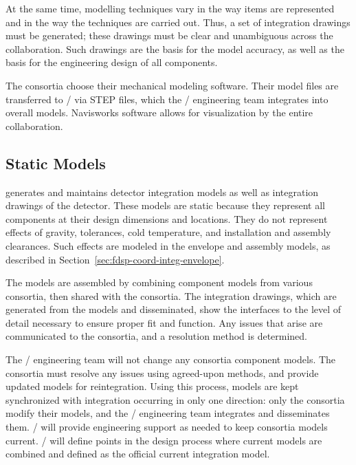 At the same time, \threed modelling techniques vary in the way items are
represented and in the way the techniques are carried out. Thus, a set
of \twod integration drawings must be generated; these drawings must be
clear and unambiguous across the collaboration. Such \twod drawings are
the basis for the \threed model accuracy, as well as the basis for the engineering
design of all components.

The consortia choose their mechanical modeling software.
Their model files are transferred to / via STEP
files, which the / engineering team integrates
into overall models.  Navisworks software allows for visualization by
the entire collaboration.

\subsection{Static Models}
\label{sec:fdsp-coord-integ-static}

 generates and maintains \threed detector integration models
as well as \twod integration drawings of the detector. These models
are static because they represent all components at their design
dimensions and locations. They do not represent effects of gravity,
tolerances, cold temperature, and installation and assembly
clearances. Such effects are modeled in the envelope and assembly
models, as described in Section~\ref{sec:fdsp-coord-integ-envelope}.


The \threed models are assembled by combining component models from
various consortia, then shared with the consortia. The \twod
integration drawings, which are generated from the \threed models and
disseminated, show the interfaces to the level of detail necessary to
ensure proper fit and function. Any issues that arise are communicated
to the consortia, and a resolution method is determined.

The / engineering team will not change any
consortia component models.  The consortia must resolve any issues
using agreed-upon methods, and provide updated models for
reintegration. Using this process, models are kept synchronized with
integration occurring in only one direction: only the consortia modify
their models, and the / engineering team
integrates and disseminates them.  / will provide
engineering support as needed to keep consortia models
current. / will define points in the design
process where current models are combined and defined as the official
current integration model.

